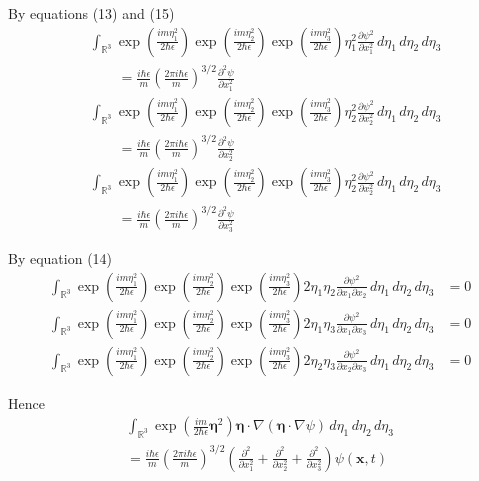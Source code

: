\documentclass[12pt]{article}
\begin{document}
By equations (13) and (15)
\begin{align*}
&\int_{\mathbb R^3}
\exp\left(\frac{im\eta_1^2}{2\hbar\epsilon}\right)
\exp\left(\frac{im\eta_2^2}{2\hbar\epsilon}\right)
\exp\left(\frac{im\eta_3^2}{2\hbar\epsilon}\right)
\eta_1^2\frac{\partial\psi^2}{\partial x_1^2}
\,d\eta_1\,d\eta_2\,d\eta_3
\\
&\qquad{}=\frac{i\hbar\epsilon}{m}\left(\frac{2\pi i\hbar\epsilon}{m}\right)^{3/2}
\frac{\partial^2\psi}{\partial x_1^2}
\\
&\int_{\mathbb R^3}
\exp\left(\frac{im\eta_1^2}{2\hbar\epsilon}\right)
\exp\left(\frac{im\eta_2^2}{2\hbar\epsilon}\right)
\exp\left(\frac{im\eta_3^2}{2\hbar\epsilon}\right)
\eta_2^2\frac{\partial\psi^2}{\partial x_2^2}
\,d\eta_1\,d\eta_2\,d\eta_3
\\
&\qquad{}=\frac{i\hbar\epsilon}{m}\left(\frac{2\pi i\hbar\epsilon}{m}\right)^{3/2}
\frac{\partial^2\psi}{\partial x_2^2}
\\
&\int_{\mathbb R^3}
\exp\left(\frac{im\eta_1^2}{2\hbar\epsilon}\right)
\exp\left(\frac{im\eta_2^2}{2\hbar\epsilon}\right)
\exp\left(\frac{im\eta_3^2}{2\hbar\epsilon}\right)
\eta_2^2\frac{\partial\psi^2}{\partial x_2^2}
\,d\eta_1\,d\eta_2\,d\eta_3
\\
&\qquad{}=\frac{i\hbar\epsilon}{m}\left(\frac{2\pi i\hbar\epsilon}{m}\right)^{3/2}
\frac{\partial^2\psi}{\partial x_3^2}
\end{align*}

By equation (14)
\begin{align*}
\int_{\mathbb R^3}
\exp\left(\frac{im\eta_1^2}{2\hbar\epsilon}\right)
\exp\left(\frac{im\eta_2^2}{2\hbar\epsilon}\right)
\exp\left(\frac{im\eta_3^2}{2\hbar\epsilon}\right)
2\eta_1\eta_2\frac{\partial\psi^2}{\partial x_1\partial x_2}
\,d\eta_1\,d\eta_2\,d\eta_3
&=0
\\
\int_{\mathbb R^3}
\exp\left(\frac{im\eta_1^2}{2\hbar\epsilon}\right)
\exp\left(\frac{im\eta_2^2}{2\hbar\epsilon}\right)
\exp\left(\frac{im\eta_3^2}{2\hbar\epsilon}\right)
2\eta_1\eta_3\frac{\partial\psi^2}{\partial x_1\partial x_3}
\,d\eta_1\,d\eta_2\,d\eta_3
&=0
\\
\int_{\mathbb R^3}
\exp\left(\frac{im\eta_1^2}{2\hbar\epsilon}\right)
\exp\left(\frac{im\eta_2^2}{2\hbar\epsilon}\right)
\exp\left(\frac{im\eta_3^2}{2\hbar\epsilon}\right)
2\eta_2\eta_3\frac{\partial\psi^2}{\partial x_2\partial x_3}
\,d\eta_1\,d\eta_2\,d\eta_3
&=0
\end{align*}

Hence
\begin{multline*}
\int_{\mathbb R^3}
\exp\left(\frac{im}{2\hbar\epsilon}\boldsymbol\eta^2\right)
\boldsymbol\eta\cdot\nabla(\boldsymbol\eta\cdot\nabla\psi)
\,d\eta_1\,d\eta_2\,d\eta_3
\\
{}=\frac{i\hbar\epsilon}{m}\left(\frac{2\pi i\hbar\epsilon}{m}\right)^{3/2}
\left(
\frac{\partial^2}{\partial x_1^2}+
\frac{\partial^2}{\partial x_2^2}+
\frac{\partial^2}{\partial x_3^2}
\right)\psi(\mathbf x,t)
\tag{18}
\end{multline*}
\end{document}
